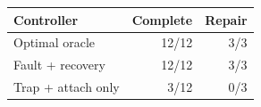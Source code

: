 \begin{tabular}{lrr}\toprule
Controller & Complete & Repair\\\midrule
Optimal oracle & 12/12 & 3/3\\
Fault + recovery & 12/12 & 3/3\\
Trap + attach only & 3/12 & 0/3\\
\bottomrule\end{tabular}
